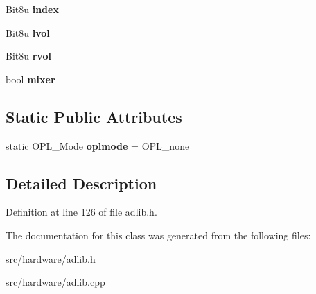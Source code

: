\begin{DoxyCompactItemize}
\item 
\hypertarget{classAdlib_1_1Module_a3cf5b48a356e922f13ff3fff91867cc5}{Bit8u {\bfseries index}}\label{classAdlib_1_1Module_a3cf5b48a356e922f13ff3fff91867cc5}

\item 
\hypertarget{classAdlib_1_1Module_ac5f795bd406e34f70cd30986e173aa58}{Bit8u {\bfseries lvol}}\label{classAdlib_1_1Module_ac5f795bd406e34f70cd30986e173aa58}

\item 
\hypertarget{classAdlib_1_1Module_ab69d004a0e0df215c99cd9aae6b25448}{Bit8u {\bfseries rvol}}\label{classAdlib_1_1Module_ab69d004a0e0df215c99cd9aae6b25448}

\item 
\hypertarget{classAdlib_1_1Module_ad6fb6e1c8fc28811c3848c754ec5d250}{bool {\bfseries mixer}}\label{classAdlib_1_1Module_ad6fb6e1c8fc28811c3848c754ec5d250}

\end{DoxyCompactItemize}
\subsection*{Static Public Attributes}
\begin{DoxyCompactItemize}
\item 
\hypertarget{classAdlib_1_1Module_a4b15a75a7fed20aa923ee1ad44a0e6c2}{static O\-P\-L\-\_\-\-Mode {\bfseries oplmode} = O\-P\-L\-\_\-none}\label{classAdlib_1_1Module_a4b15a75a7fed20aa923ee1ad44a0e6c2}

\end{DoxyCompactItemize}


\subsection{Detailed Description}


Definition at line 126 of file adlib.\-h.



The documentation for this class was generated from the following files\-:\begin{DoxyCompactItemize}
\item 
src/hardware/adlib.\-h\item 
src/hardware/adlib.\-cpp\end{DoxyCompactItemize}
